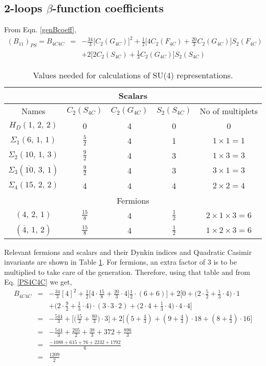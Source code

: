 \documentclass[11pt,prd,superscriptaddress,nofootinbib]{revtex4-1}
\def\sbar{\overline}
\numberwithin{equation}{section}
\newcommand{\bea}{\begin{eqnarray}}
\newcommand{\eea}{\end{eqnarray}}
\begin{document}
\subsection{2-loops $\beta$-function coefficients}

From Eqn. \ref{genBcoeff},
\bea
\label{PS4C4C1}
(B_{11})_{PS}=B_{4C4C} &=& -\frac{34}{3}\big[C_2(G_{4C})\big]^2+\frac{1}{2}\bigg[4C_2(F_{4C})+\frac{20}{3} C_2(G_{4C})\bigg]S_2(F_{4C})\nonumber\\
&& +2\bigg[2C_2(S_{4C})+\frac{1}{3} C_2(G_{4C})\bigg]S_2(S_{4C})
\eea

\begin{table}[H]
\begin{center}
\begin{tabular}{|c|c|c|c|c|}
\hline
\multicolumn{5}{|c|}{Scalars} \\ \hline
Names &  $C_2(S_{4C})$ & $C_2(G_{4C})$ & $S_2(S_{4C})$ & No of multiplets\\  \hline\hline
$H_D(1,\,2,\,2)$ & 0 & 4 & 0 & 0
\\ \hline
$\Sigma_1(6,\,1,\,1)$ & $\frac{5}{2}$ & 4 & 1 & $1\times 1=1$
\\ \hline
$\Sigma_2(10,\,1,\,3)$ & $\frac{9}{2}$ & 4 & 3 & $1\times 3=3$
\\ \hline
$\Sigma_3(\sbar {10},\,3,\,1)$ & $\frac{9}{2}$ & 4 & 3 & $3\times 1=3$
\\ \hline
$\Sigma_4(15,\,2,\,2)$ & 4 & 4 & 4 & $2\times 2=4$
\\ \hline\hline
\multicolumn{5}{|c|}{Fermions} \\ \hline
$(4,\,2,\,1)$ & $\frac{15}{8}$ & 4 & $\frac{1}{2}$ & $2\times 1\times 3=6$
\\ \hline
$(\sbar 4,\,1,\,2)$ & $\frac{15}{8}$ & 4 & $\frac{1}{2}$ & $1\times 2\times 3=6$
\\ \hline
\end{tabular}
\caption{Values needed for calculations of SU(4) representations.\label{tab:PS4C4C}}
\vspace{-0.6cm}
\end{center}
\end{table}
Relevant fermions and scalars and their Dynkin indices and Quadratic Casimir invariants are shown in Table \ref{tab:PS4C4C}. For fermions, an extra factor of 3 is to be multiplied to take care of the generation. Therefore, using that table and from Eq. \ref{PS4C4C} we get,
\bea
\label{PS4C4C}
B_{4C4C} &=& -\frac{34}{3}[4]^2+\frac{1}{2}\big[4\cdot\frac{15}{8}+\frac{20}{3}\cdot 4\big]\frac{1}{2}\cdot(6+6)\big]+2\big[0+\big(2\cdot\frac{5}{2}+\frac{1}{3}\cdot 4\big)\cdot 1 \nonumber\\
&& +\big(2\cdot\frac{9}{2}+\frac{1}{3}\cdot 4\big)\cdot(3\cdot 3\cdot 2)+(2\cdot 4+\frac{1}{3}\cdot 4\big)\cdot 4\cdot 4 \big]\nonumber\\
&=& -\frac{544}{3}+\big[\big(\frac{15}{2}+\frac{80}{3}\big)\cdot 3\big]+2\big[(5+\frac{4}{3})+(9+\frac{4}{3})\cdot 18+(8+\frac{4}{3})\cdot 16\big]\nonumber\\
&=&  -\frac{544}{3}+\frac{205}{2}+\frac{38}{3}+372+\frac{896}{3}\nonumber\\
&=& \frac{-1088+615+76+2232+1792}{6}\nonumber\\
&=& \boxed{\frac{1209}{2}}
\eea 
\end{document}

